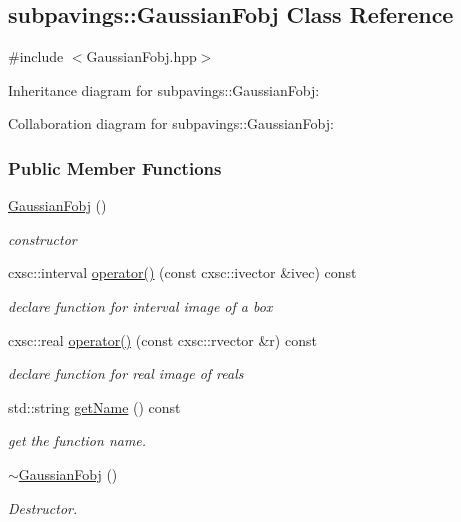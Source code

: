 \hypertarget{classsubpavings_1_1GaussianFobj}{\subsection{subpavings\-:\-:\-Gaussian\-Fobj \-Class \-Reference}
\label{classsubpavings_1_1GaussianFobj}
}


{\ttfamily \#include $<$\-Gaussian\-Fobj.\-hpp$>$}



\-Inheritance diagram for subpavings\-:\-:\-Gaussian\-Fobj\-:


\-Collaboration diagram for subpavings\-:\-:\-Gaussian\-Fobj\-:
\subsubsection*{\-Public \-Member \-Functions}
\begin{DoxyCompactItemize}
\item 
\hyperlink{classsubpavings_1_1GaussianFobj_ad9e9d18b2e13476a463bbef168816a9e}{\-Gaussian\-Fobj} ()
\begin{DoxyCompactList}\small\item\em constructor \end{DoxyCompactList}\item 
cxsc\-::interval \hyperlink{classsubpavings_1_1GaussianFobj_a0470c3c772783ea453e62675f75a4aa1}{operator()} (const cxsc\-::ivector \&ivec) const 
\begin{DoxyCompactList}\small\item\em declare function for interval image of a box \end{DoxyCompactList}\item 
cxsc\-::real \hyperlink{classsubpavings_1_1GaussianFobj_af865ee5060e1c83d2f484b1b697bc85c}{operator()} (const cxsc\-::rvector \&r) const 
\begin{DoxyCompactList}\small\item\em declare function for real image of reals \end{DoxyCompactList}\item 
std\-::string \hyperlink{classsubpavings_1_1GaussianFobj_a1c141bf5ba6b8bdefccfaa3e232a0bcc}{get\-Name} () const 
\begin{DoxyCompactList}\small\item\em get the function name. \end{DoxyCompactList}\item 
\hyperlink{classsubpavings_1_1GaussianFobj_a75f3d496396c90a3b7f55d926fa7c5a7}{$\sim$\-Gaussian\-Fobj} ()
\begin{DoxyCompactList}\small\item\em \-Destructor. \end{DoxyCompactList}\end{DoxyCompactItemize}


